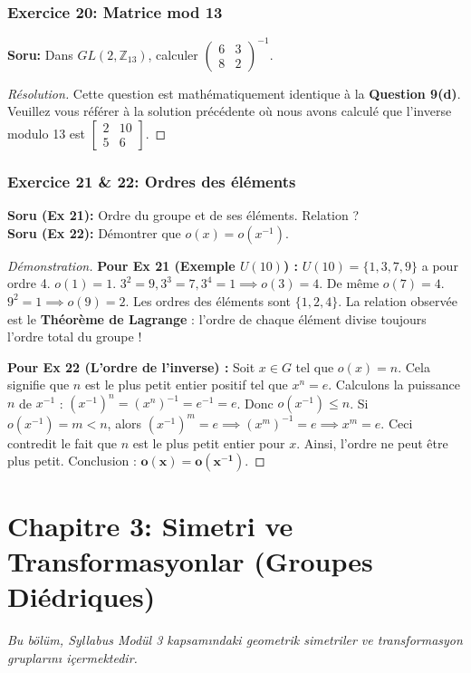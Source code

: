 \documentclass[12pt,a4paper]{report}
\begin{document}
\subsection*{Exercice 20: Matrice mod 13}
\textbf{Soru:} Dans $GL(2, \mathbb{Z}_{13})$, calculer $\begin{pmatrix} 6 & 3 \\ 8 & 2 \end{pmatrix}^{-1}$.
\begin{proof}[Résolution]
Cette question est mathématiquement identique à la \textbf{Question 9(d)}. Veuillez vous référer à la solution précédente où nous avons calculé que l'inverse modulo 13 est $\begin{bmatrix} 2 & 10 \\ 5 & 6 \end{bmatrix}$.
\end{proof}

\subsection*{Exercice 21 \& 22: Ordres des éléments}
\textbf{Soru (Ex 21):} Ordre du groupe et de ses éléments. Relation ? \\
\textbf{Soru (Ex 22):} Démontrer que $o(x) = o(x^{-1})$.
\begin{proof}[Démonstration]
\textbf{Pour Ex 21 (Exemple $U(10)$) :} $U(10) = \{1, 3, 7, 9\}$ a pour ordre 4.
$o(1)=1$. $3^2=9, 3^3=7, 3^4=1 \implies o(3)=4$. De même $o(7)=4$. $9^2=1 \implies o(9)=2$.
Les ordres des éléments sont $\{1, 2, 4\}$. La relation observée est le \textbf{Théorème de Lagrange} : l'ordre de chaque élément divise toujours l'ordre total du groupe !

\textbf{Pour Ex 22 (L'ordre de l'inverse) :}
Soit $x \in G$ tel que $o(x) = n$. Cela signifie que $n$ est le plus petit entier positif tel que $x^n = e$.
Calculons la puissance $n$ de $x^{-1}$ : $(x^{-1})^n = (x^n)^{-1} = e^{-1} = e$.
Donc $o(x^{-1}) \leq n$.
Si $o(x^{-1}) = m < n$, alors $(x^{-1})^m = e \implies (x^m)^{-1} = e \implies x^m = e$. Ceci contredit le fait que $n$ est le plus petit entier pour $x$.
Ainsi, l'ordre ne peut être plus petit. Conclusion : $\mathbf{o(x) = o(x^{-1})}$.
\end{proof}

\chapter{Chapitre 3: Simetri ve Transformasyonlar (Groupes Diédriques)}
\textit{Bu bölüm, Syllabus Modül 3 kapsamındaki geometrik simetriler ve transformasyon gruplarını içermektedir.}
\end{document}
